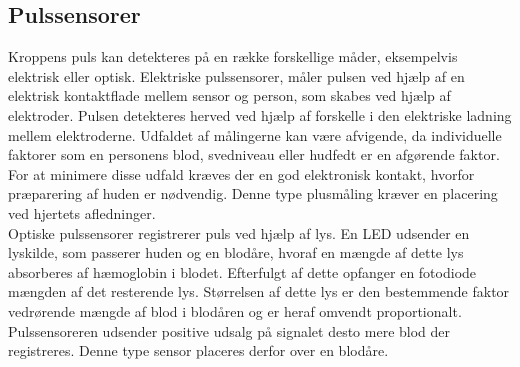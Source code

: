 \subsection{Pulssensorer}\label{sec:pulssensor}
Kroppens puls kan detekteres på en række forskellige måder, eksempelvis elektrisk eller optisk. Elektriske pulssensorer, måler pulsen ved hjælp af en elektrisk kontaktflade mellem sensor og person, som skabes ved hjælp af elektroder. Pulsen detekteres herved ved hjælp af forskelle i den elektriske ladning mellem elektroderne. Udfaldet af målingerne kan være afvigende, da individuelle faktorer som en personens blod, svedniveau eller hudfedt er en afgørende faktor. For at minimere disse udfald kræves der en god elektronisk kontakt, hvorfor præparering af huden er nødvendig. Denne type plusmåling kræver en placering ved hjertets afledninger. \citep{PhuaLissorguesMercier2009}  \\
Optiske pulssensorer registrerer puls ved hjælp af lys. En LED udsender en lyskilde, som passerer huden og en blodåre, hvoraf en mængde af dette lys absorberes af hæmoglobin i blodet. Efterfulgt af dette opfanger en fotodiode mængden af det resterende lys. Størrelsen af dette lys er den bestemmende faktor vedrørende mængde af blod i blodåren og er heraf omvendt proportionalt. Pulssensoreren udsender positive udsalg på signalet desto mere blod der registreres. Denne type sensor placeres derfor over en blodåre. \citep{PhuaLissorguesMercier2009,SrinivasReddySrinivas2006} 
%
%
